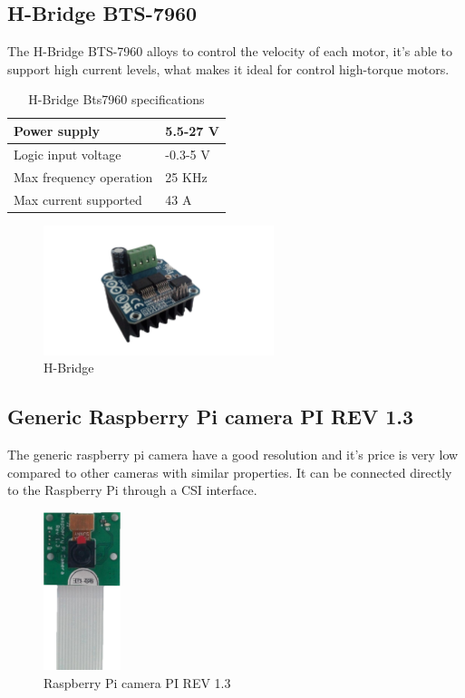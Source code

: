 \subsection{H-Bridge BTS-7960}

The H-Bridge BTS-7960 alloys to control the velocity of each motor, it’s able to support high current levels, what makes it ideal for control high-torque motors.
\begin{table}[H]
\caption{H-Bridge Bts7960 specifications}
\begin{centering}
\begin{tabular}{>{\centering}p{7cm}>{\centering}p{4cm}}
\hline 
\raggedright{}Power supply & \raggedright{}5.5-27 V\tabularnewline
\hline 
\raggedright{}Logic input voltage & \raggedright{}-0.3-5 V\tabularnewline
\hline 
\raggedright{}Max frequency operation & \raggedright{}25 KHz\tabularnewline
\hline 
\raggedright{}Max current supported & \raggedright{}43 A\tabularnewline
\hline 
\end{tabular}
\par\end{centering}
\end{table}


\begin{figure}[H]
    \centering
 	\includegraphics[trim=0 0 0 0,clip,width=0.6\textwidth]{Figs/Hbridge1.png}
    \caption{H-Bridge}
    \label{fig:H-bridge}
\end{figure}

\subsection{Generic Raspberry Pi camera PI REV 1.3}
The generic raspberry pi camera have a good resolution and it’s price is very low compared to other cameras with similar properties. It can be connected directly to the Raspberry Pi through a CSI interface.
\begin{figure}[H]
    \centering
 	\includegraphics[trim=0 0 0 0,clip,width=0.2\textwidth]{Figs/Rasp_camera.png}
    \caption{Raspberry Pi camera PI REV 1.3}
    \label{fig:Rasp_camera}
\end{figure}

